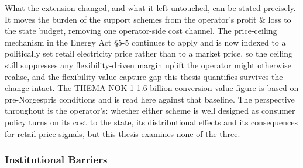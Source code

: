 What the extension changed, and what it left untouched, can be stated precisely. It moves the burden of the support schemes from the operator's profit \& loss to the state budget, removing one operator-side cost channel. The price-ceiling mechanism in the Energy Act §5-5 \cite{energidepartementet_lov_1991} continues to apply and is now indexed to a politically set retail electricity price rather than to a market price, so the ceiling still suppresses any flexibility-driven margin uplift the operator might otherwise realise, and the flexibility-value-capture gap this thesis quantifies survives the change intact. The THEMA NOK 1-1.6 billion conversion-value figure is based on pre-Norgespris conditions and is read here against that baseline. The perspective throughout is the operator's: whether either scheme is well designed as consumer policy turns on its cost to the state, its distributional effects and its consequences for retail price signals, but this thesis examines none of the three.

\subsubsection{Institutional Barriers}
\label{2-subsec:2.3.4 institutional barriers}

